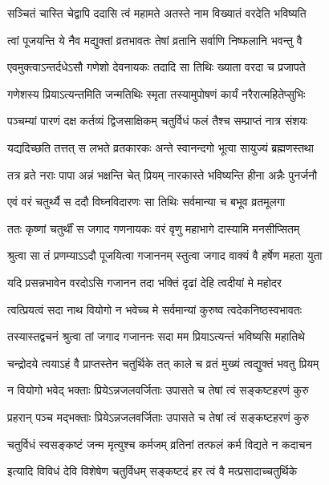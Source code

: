 \twolineshloka
{सञ्चितं चास्ति चेद्वापि ददासि त्वं महामते}
{अतस्ते नाम विख्यातं वरदेति भविष्यति} %

\twolineshloka
{त्वां पूजयन्ति ये नैव मद्युक्तां व्रतभावतः}
{तेषां व्रतानि सर्वाणि निष्फलानि भवन्तु वै} %

\twolineshloka
{एवमुक्त्वाऽन्तर्दधेऽसौ गणेशो देवनायकः}
{तदादि सा तिथिः ख्याता वरदा च प्रजापते} %

\twolineshloka
{गणेशस्य प्रियाऽत्यन्तमिति जन्मतिथिः स्मृता}
{तस्यामुपोषणं कार्यं नरैरात्महितेप्सुभिः} %

\twolineshloka
{पञ्चम्यां पारणं दक्ष कर्तव्यं द्विजसाक्षिकम्}
{चतुर्विधं फलं तैश्च सम्प्राप्तं नात्र संशयः} %

\twolineshloka
{यद्यदिच्छति तत्तत् स लभते व्रतकारकः}
{अन्ते स्वानन्दगो भूत्वा सायुज्यं ब्रह्मणस्तथा} %

\twolineshloka
{तत्र व्रते नराः पापा अन्नं भक्षन्ति चेत् प्रियम्}
{नारकास्ते भविष्यन्ति हीना अन्नैः पुनर्जनौ} %

\twolineshloka
{एवं वरं चतुर्थ्यै स ददौ विघ्नविदारणः}
{सा तिथिः सर्वमान्या च बभूव व्रतमूलगा} %

\twolineshloka
{ततः कृष्णां चतुर्थीं स जगाद गणनायकः}
{वरं वृणु महाभागे दास्यामि मनसीप्सितम्} %

\twolineshloka
{श्रुत्वा सा तं प्रणम्याऽऽदौ पूजयित्वा गजाननम्}
{स्तुत्वा जगाद वाक्यं वै हर्षेण महता युता} %


\twolineshloka
{यदि प्रसन्नभावेन वरदोऽसि गजानन}
{तदा भक्तिं दृढां देहि त्वदीयां मे महोदर} %

\twolineshloka
{त्वत्प्रियत्वं सदा नाथ वियोगो न भवेच्च मे}
{सर्वमान्यां कुरुष्व त्वदेकनिष्ठस्वभावतः} %

\twolineshloka
{तस्यास्तद्वचनं श्रुत्वा तां जगाद गजाननः}
{सदा मम प्रियाऽत्यन्तं भविष्यसि महातिथे} %

\twolineshloka
{चन्द्रोदये त्वयाऽहं वै प्राप्तस्तेन चतुर्थिके}
{तत् काले च व्रतं मुख्यं त्वद्युक्तं भवतु प्रियम्} %

\twolineshloka
{न वियोगो भवेद् भक्ताः प्रियेऽन्नजलवर्जिताः}
{उपासते च तेषां त्वं सङ्कष्टहरणं कुरु} %

\twolineshloka
{प्रहरान् पञ्च मद्भक्ताः प्रियेऽन्नजलवर्जिताः}
{उपासते च तेषां त्वं सङ्कष्टहरणं कुरु} %

\twolineshloka
{चतुर्विधं स्वसङ्कष्टं जन्म मृत्युश्च कर्मजम्}
{व्रतिनां तत्फलं कर्म विद्यते न कदाचन} %

\twolineshloka
{इत्यादि विविधं देवि विशेषेण चतुर्विधम्}
{सङ्कष्टदं हर त्वं वै मत्प्रसादाच्चतुर्थिके} %

